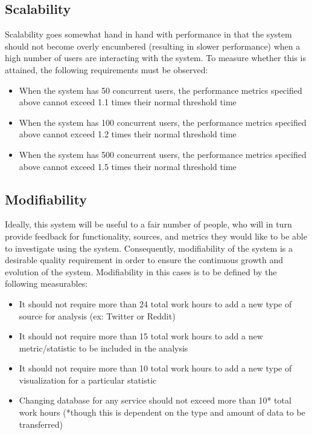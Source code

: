 \documentclass[12pt]{article}
\begin{document}
\subsection{Scalability}
Scalability goes somewhat hand in hand with performance in that the system should not become overly encumbered (resulting in slower performance) when a high number of users are interacting with the system. To measure whether this is attained, the following requirements must be observed:
\begin{itemize}
    \item When the system has 50 concurrent users, the performance metrics specified above cannot exceed 1.1 times their normal threshold time
    \item When the system has 100 concurrent users, the performance metrics specified above cannot exceed 1.2 times their normal threshold time
    \item When the system has 500 concurrent users, the performance metrics specified above cannot exceed 1.5 times their normal threshold time
\end{itemize}
\subsection{Modifiability}
Ideally, this system will be useful to a fair number of people, who will in turn provide feedback for functionality, sources, and metrics they would like to be able to investigate using the system. Consequently, modifiability of the system is a desirable quality requirement in order to ensure the continuous growth and evolution of the system. Modifiability in this cases is to be defined by the following measurables:
\begin{itemize}
    \item It should not require more than 24 total work hours to add a new type of source for analysis (ex: Twitter or Reddit)
    \item It should not require more than 15 total work hours to add a new metric/statistic to be included in the analysis
    \item It should not require more than 10 total work hours to add a new type of visualization for a particular statistic
    \item Changing database for any service should not exceed more than 10* total work hours (*though this is dependent on the type and amount of data to be transferred)
\end{itemize}

\newpage
\end{document}
